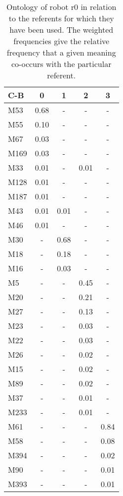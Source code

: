 \begin{table}[h]
\centering
{\footnotesize\begin{tabular}{||l|c|c|c|c||}
\hline\hline
C-B & 0 & 1 & 2 & 3\\\hline
M53 & 0.68 & - & - & -\\\hline
M55 & 0.10 & - & - & -\\\hline
M67 & 0.03 & - & - & -\\\hline
M169 & 0.03 & - & - & -\\\hline
M33 & 0.01 & - & 0.01 & -\\\hline
M128 & 0.01 & - & - & -\\\hline
M187 & 0.01 & - & - & -\\\hline
M43 & 0.01 & 0.01 & - & -\\\hline
M46 & 0.01 & - & - & -\\\hline
M30 & - & 0.68 & - & -\\\hline
M18 & - & 0.18 & - & -\\\hline
M16 & - & 0.03 & - & -\\\hline
M5 & - & - & 0.45 & -\\\hline
M20 & - & - & 0.21 & -\\\hline
M27 & - & - & 0.13 & -\\\hline
M23 & - & - & 0.03 & -\\\hline
M22 & - & - & 0.03 & -\\\hline
M26 & - & - & 0.02 & -\\\hline
M15 & - & - & 0.02 & -\\\hline
M89 & - & - & 0.02 & -\\\hline
M37 & - & - & 0.01 & -\\\hline
M233 & - & - & 0.01 & -\\\hline
M61 & - & - & - & 0.84\\\hline
M58 & - & - & - & 0.08\\\hline
M394 & - & - & - & 0.02\\\hline
M90 & - & - & - & 0.01\\\hline
M393 & - & - & - & 0.01\\\hline
\hline
\end{tabular}}
\caption{Ontology of robot r0 in relation to the referents for which they have been used. The weighted frequencies give the relative frequency that a given meaning co-occurs with the particular referent.}
\label{t:st:ontology0}
\end{table}

